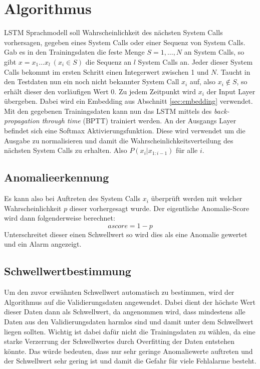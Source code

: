 \section{Algorithmus}
\label{sec:Algorithmus}
    LSTM Sprachmodell soll Wahrscheinlichkeit des nächsten System Calls vorhersagen, gegeben eines System Calls oder einer Sequenz von System Calls.
    Gab es in den Trainingsdaten die feste Menge $S = {1,\dots,N}$ an System Calls, so gibt $x=x_1\dots x_l \ (x_i\in S)$ die Sequenz an $l$ System Calls an.
    Jeder dieser System Calls bekommt im ersten Schritt einen Integerwert zwischen 1 und $N$.
    Taucht in den Testdaten nun ein noch nicht bekannter System Call $x_i$ auf, also $x_i \notin S$, so erhält dieser den vorläufigen Wert 0.
    Zu jedem Zeitpunkt wird $x_i$ der Input Layer übergeben.
    Dabei wird ein Embedding aus Abschnitt \ref{sec:embedding} verwendet. 
    Mit den gegebenen Trainingsdaten kann nun das LSTM mittels des \textit{back-propagation through time} (BPTT) trainiert werden.
    An der Ausgangs Layer befindet sich eine Softmax Aktivierungsfunktion.
    Diese wird verwendet um die Ausgabe zu normalisieren und damit die Wahrscheinlichkeitsverteilung des nächsten System Calls zu erhalten.
    Also $P\left(x_i|x_{1:i-1}\right)$ für alle $i$. 
    
    \subsection{Anomalieerkennung}
        Es kann also bei Auftreten des System Calls $x_i$ überprüft werden mit welcher Wahrscheinlichkeit $p$ dieser vorhergesagt wurde.
        Der eigentliche Anomalie-Score wird dann folgenderweise berechnet:
        \begin{equation}
            ascore = 1 - p
        \end{equation}
        Unterschreitet dieser einen Schwellwert so wird dies als eine Anomalie gewertet und ein Alarm angezeigt.
        \subsection{Schwellwertbestimmung}
        Um den zuvor erwähnten Schwellwert automatisch zu bestimmen, wird der Algorithmus auf die Validierungsdaten angewendet. 
        Dabei dient der höchste Wert dieser Daten dann als Schwellwert, da angenommen wird, dass mindestens alle Daten aus den Validierungsdaten harmlos sind und damit unter dem Schwellwert liegen sollten.
        Wichtig ist dabei dafür nicht die Trainingsdaten zu wählen, da eine starke Verzerrung der Schwellwertes durch Overfitting der Daten entstehen könnte. 
        Das würde bedeuten, dass nur sehr geringe Anomaliewerte auftreten und der Schwellwert sehr gering ist und damit die Gefahr für viele Fehlalarme besteht.

